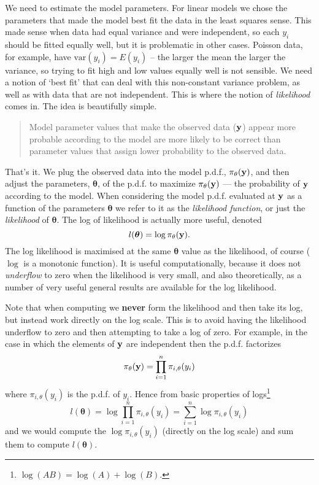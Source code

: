 \documentclass[10pt] {article}
\theoremstyle{definition}
\begin{document}
We need to estimate the model parameters. For linear models we chose the parameters that made the model best fit the data in the least squares sense. This made sense when data had equal variance and were independent, so each $y_i$ should be fitted equally well, but it is problematic in other cases. Poisson data, for example, have $\text{var}(y_i) = E(y_i)$ -- the larger the mean the larger the variance, so trying to fit high and low values equally well is not sensible. We need a notion of `best fit' that can deal with this non-constant variance problem, as well as with data that are not independent. This is where the notion of {\em likelihood} comes in. The idea is beautifully simple.
\begin{quote}
Model parameter values that make the observed data ($\bf y$) appear more probable according to the model are more likely to be correct than parameter values that assign lower probability to the observed data.
\end{quote} 
That's it. We plug the observed data into the model p.d.f., $\pi_\theta({\bf y})$, and then adjust the parameters, $\bm \theta$, of the p.d.f. to maximize $\pi_\theta({\bf y})$ --- the probability of $\bf y$ according to the model. When considering the model p.d.f. evaluated at $\bf y$ as a function of the parameters $\bm \theta$ we refer to it as the {\em likelihood function}, or just the {\em likelihood} of $\bm \theta$. The log of likelihood is actually more useful, denoted
$$
l({\bm \theta}) = \log \pi_\theta({\bf y}).
$$  
The log likelihood is maximised at the same $\bm \theta$ value as the likelihood, of course ($\log$ is a monotonic function). It is useful computationally, because it does not {\em underflow} to zero when the likelihood is very small, and also theoretically, as a number of very useful general results are available for the log likelihood. 

Note that when computing we {\bf never} form the likelihood and then take its log, but instead work directly on the log scale. This is to avoid having the likelihood underflow to zero and then attempting to take a log of zero. For example, in the case in which the elements of $\bf y$ are independent then the p.d.f. factorizes
$$
\pi_{\theta}({\bf y}) = \prod_{i=1}^n \pi_{i,\theta}(y_i)
$$ 
where $\pi_{i,\theta}(y_i)$ is the p.d.f. of $y_i$. Hence from basic properties of logs\footnote{$\log(AB) = \log(A) + \log(B)$.} 
$$
l({\bm \theta}) = \log \prod_{i=1}^n \pi_{i,\theta}(y_i) = \sum_{i=1}^n \log \pi_{i,\theta}(y_i)
$$
and we would compute the $\log \pi_{i,\theta}(y_i)$ (directly on the log scale) and sum them to compute $l({\bm \theta})$.
\end{document}
